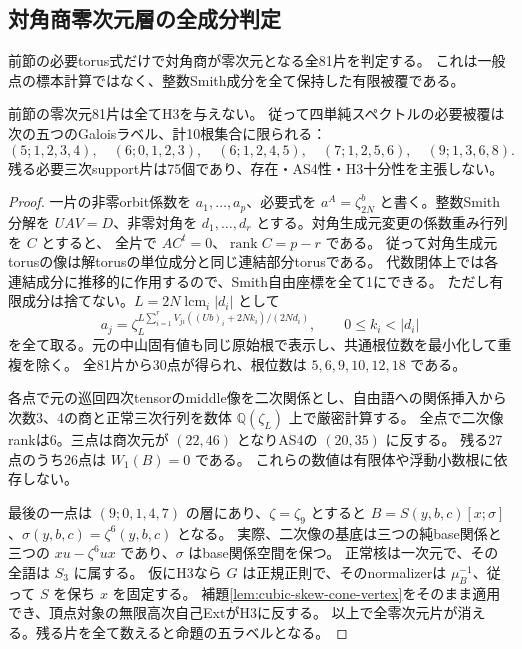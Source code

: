 \subsection{対角商零次元層の全成分判定}
\label{subsec:cubic-four-simple-zero-dimensional}
前節の必要torus式だけで対角商が零次元となる全81片を判定する。
これは一般点の標本計算ではなく、整数Smith成分を全て保持した有限被覆である。
\begin{proposition}\label{prop:cubic-four-simple-zero-dimensional}
前節の零次元81片は全てH3を与えない。
従って四単純スペクトルの必要被覆は次の五つのGaloisラベル、計10根集合に限られる：
\[
 (5;1,2,3,4),\quad (6;0,1,2,3),\quad (6;1,2,4,5),\quad
 (7;1,2,5,6),\quad (9;1,3,6,8).
\]
残る必要三次support片は75個であり、存在・AS4性・H3十分性を主張しない。
\end{proposition}
\begin{proof}
一片の非零orbit係数を $a_1,\ldots,a_p$、必要式を
$a^A=\zeta_{2N}^{b}$ と書く。整数Smith分解を $UAV=D$、非零対角を
$d_1,\ldots,d_r$ とする。対角生成元変更の係数重み行列を $C$ とすると、
全片で $AC^t=0$、$\operatorname{rank}C=p-r$ である。
従って対角生成元torusの像は解torusの単位成分と同じ連結部分torusである。
代数閉体上では各連結成分に推移的に作用するので、Smith自由座標を全て1にできる。
ただし有限成分は捨てない。$L=2N\operatorname{lcm}_i|d_i|$ として
\[
 a_j=\zeta_L^{L\sum_{i=1}^r V_{ji}((Ub)_i+2Nk_i)/(2Nd_i)},
 \qquad 0\leq k_i<|d_i|
\]
を全て取る。元の中山固有値も同じ原始根で表示し、共通根位数を最小化して重複を除く。
全81片から30点が得られ、根位数は $5,6,9,10,12,18$ である。

各点で元の巡回四次tensorのmiddle像を二次関係とし、自由語への関係挿入から
次数3、4の商と正常三次行列を数体 $\mathbb Q(\zeta_L)$ 上で厳密計算する。
全点で二次像rankは6。三点は商次元が $(22,46)$ となりAS4の $(20,35)$ に反する。
残る27点のうち26点は $W_1(B)=0$ である。
これらの数値は有限体や浮動小数根に依存しない。

最後の一点は $(9;0,1,4,7)$ の層にあり、$\zeta=\zeta_9$ とすると
$B=S(y,b,c)[x;\sigma]$、$\sigma(y,b,c)=\zeta^6(y,b,c)$ となる。
実際、二次像の基底は三つの純base関係と三つの
$xu-\zeta^6ux$ であり、$\sigma$ はbase関係空間を保つ。
正常核は一次元で、その全語は $S_3$ に属する。
仮にH3なら $G$ は正規正則で、そのnormalizerは $\mu_B^{-1}$、従って
$S$ を保ち $x$ を固定する。
補題\ref{lem:cubic-skew-cone-vertex}をそのまま適用でき、頂点対象の無限高次自己ExtがH3に反する。
以上で全零次元片が消える。残る片を全て数えると命題の五ラベルとなる。
\end{proof}

